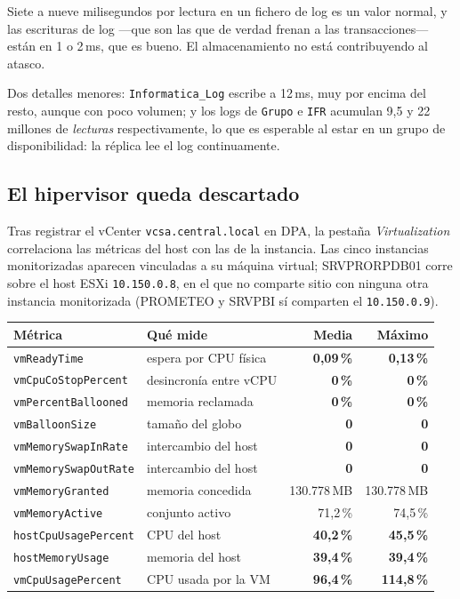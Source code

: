 \documentclass[11pt,a4paper]{article}
\newcommand{\cod}[1]{\texttt{\small #1}}
\newcommand{\bien}[1]{\textcolor{verde}{\textbf{#1}}}
\newcommand{\aviso}[1]{\textcolor{ambar}{\textbf{#1}}}
\begin{document}
Siete a nueve milisegundos por lectura en un fichero de log es un valor
normal, y las escrituras de log —que son las que de verdad frenan a las
transacciones— están en 1 o 2\,ms, que es bueno. El almacenamiento no está
contribuyendo al atasco.

Dos detalles menores: \cod{Informatica\_Log} escribe a 12\,ms, muy por encima
del resto, aunque con poco volumen; y los logs de \cod{Grupo} e \cod{IFR}
acumulan 9,5 y 22 millones de \emph{lecturas} respectivamente, lo que es
esperable al estar en un grupo de disponibilidad: la réplica lee el log
continuamente.

\subsection{El hipervisor queda descartado}

Tras registrar el vCenter \cod{vcsa.central.local} en DPA, la pestaña
\emph{Virtualization} correlaciona las métricas del host con las de la
instancia. Las cinco instancias monitorizadas aparecen vinculadas a su
máquina virtual; SRVPRORPDB01 corre sobre el host ESXi \cod{10.150.0.8}, en
el que no comparte sitio con ninguna otra instancia monitorizada
(PROMETEO y SRVPBI sí comparten el \cod{10.150.0.9}).

\begin{table}[h]
\centering
\small
\begin{tabular}{llrr}
\toprule
\textbf{Métrica} & \textbf{Qué mide} & \textbf{Media} & \textbf{Máximo} \\
\midrule
\cod{vmReadyTime}        & espera por CPU física   & \bien{0,09\,\%} & \bien{0,13\,\%} \\
\cod{vmCpuCoStopPercent} & desincronía entre vCPU  & \bien{0\,\%}    & \bien{0\,\%} \\
\cod{vmPercentBallooned} & memoria reclamada       & \bien{0\,\%}    & \bien{0\,\%} \\
\cod{vmBalloonSize}      & tamaño del globo        & \bien{0}        & \bien{0} \\
\cod{vmMemorySwapInRate} & intercambio del host    & \bien{0}        & \bien{0} \\
\cod{vmMemorySwapOutRate}& intercambio del host    & \bien{0}        & \bien{0} \\
\cod{vmMemoryGranted}    & memoria concedida       & 130.778\,MB     & 130.778\,MB \\
\cod{vmMemoryActive}     & conjunto activo         & 71,2\,\%        & 74,5\,\% \\
\cod{hostCpuUsagePercent}& CPU del host            & \bien{40,2\,\%} & \bien{45,5\,\%} \\
\cod{hostMemoryUsage}    & memoria del host        & \bien{39,4\,\%} & \bien{39,4\,\%} \\
\cod{vmCpuUsagePercent}  & CPU usada por la VM     & \aviso{96,4\,\%}& \aviso{114,8\,\%} \\
\bottomrule
\end{tabular}
\end{table}
\end{document}

